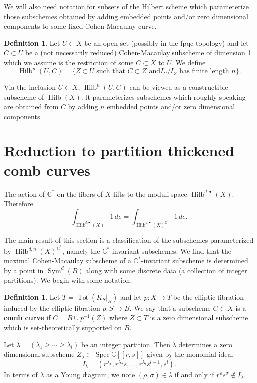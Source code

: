 \documentclass[12pt]{amsart}
\theoremstyle{definition}
\newtheorem{definition}[theorem]{Definition}
\newcommand{\CC} {\mathbb{C}}          %
\newcommand{\Sym}{\operatorname{Sym}}
\newcommand{\Hilb}{\operatorname{Hilb}}
\newcommand{\Tot}{\operatorname{Tot}}
\newcommand{\Spec}{\operatorname{Spec}}
\newcommand{\presectionspace}{\vspace{0.2cm}} %
\begin{document}
We will also need notation for subsets of the Hilbert scheme which
parameterize those subschemes obtained by adding embedded points
and/or zero dimensional components to
some fixed Cohen-Macaulay curve.

\begin{definition}\label{defn: Hilb(U,C)}
Let $U\subset X$ be an open set (possibly in the fpqc topology) and
let $C\subset U$ be a (not necessarily reduced)
Cohen-Macaulay subscheme of dimension 1 which we assume is the
restriction of some $\overline{C}\subset X$ to $U$. We define 
\[
\Hilb^{n}(U,C) = \{Z\subset U\text{ such that }C\subset Z\text{ and
$I_{C}/I_{Z}$ has finite length $n$} \}.
\]
\end{definition}
Via the inclusion $U\subset X$, $\Hilb^{n}(U,C)$ can be viewed as a
constructible subscheme of $\Hilb (X)$. It parameterizes subschemes
which roughly speaking are obtained from $C$ by adding $n$ embedded
points and/or zero dimensional components.

\presectionspace
\section{Reduction to partition thickened comb curves}\label{sec: reduction to thickened comb curves}

The action of $\CC^*$ on the fibers of $X$ lifts to the moduli space
$\Hilb^{d,\bullet}(X)$. Therefore
$$
\int_{\Hilb^{d,\bullet}(X)} 1 \, de = \int_{\Hilb^{d,\bullet}(X)^{\CC^*}} 1 \, de.
$$

The main result of this section is a classification of the subschemes
parameterized by $\Hilb^{d,n}(X)^{\CC^{*}}$, namely the
$\CC^{*}$-invariant subschemes.  We find that the maximal
Cohen-Macaulay subscheme of a $\CC^{*}$-invariant subscheme is
determined by a point in $\Sym^{d}(B)$ along with some discrete data
(a collection of integer partitions). We begin with some notation.




\begin{definition}\label{defn: comb curves} 
Let $T=\Tot(K_{S}|_{B})$ and let $p:X\to T$ be the elliptic fibration
induced by the elliptic fibration $p:S\to B$. We say that a subscheme $C\subset
X$ is a \textbf{comb curve} if $C=B\cup p^{-1}(Z) $ where $Z\subset T$
is a zero dimensional subscheme which is set-theoretically supported on
$B$.
\end{definition}

Let $\lambda =(\lambda_{1}\geq \dotsb \geq \lambda_{l}) $ be an
integer partition. Then $\lambda$ determines a zero dimensional subscheme
$Z_{\lambda}\subset \Spec \CC [[r,s]]$ given by the monomial ideal
\begin{equation}\label{eqn: monomial ideal I given by a partition lambda}
I_{\lambda}=(r^{\lambda_{1}},r^{\lambda_{2}}s,\dotsc
,r^{\lambda_{l}}s^{l-1},s^{l}).
\end{equation}
In terms of $\lambda$ as a Young diagram, we note $(\rho ,\sigma)\in
\lambda$ if and only if $r^{\rho}s^{\sigma}\notin I_{\lambda}.$
\end{document}
